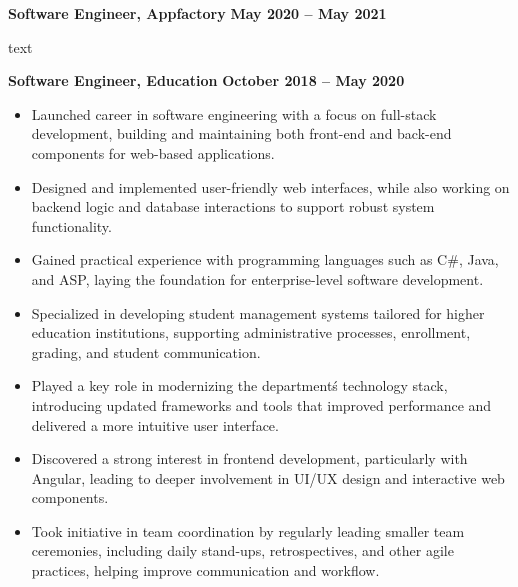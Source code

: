 \documentclass[10pt, a4paper]{cvhari}
\begin{document}
\smallskip
\divider
\smallskip

    \textbf{Software Engineer, Appfactory} \hfill \textbf{May 2020 -- May 2021}

    \vspace{0.2em}
    \par
        text
    \par


\smallskip
\divider
\smallskip

    \textbf{Software Engineer, Education} \hfill \textbf{October 2018 -- May 2020}

    \vspace{0.2em}
    \begin{itemize}
         
        \item Launched career in software engineering with a focus on full-stack development, building and maintaining both front-end and back-end components for web-based applications.

        \item Designed and implemented user-friendly web interfaces, while also working on backend logic and database interactions to support robust system functionality.

        \item Gained practical experience with programming languages such as C\#, Java, and ASP, laying the foundation for enterprise-level software development.

        \item Specialized in developing student management systems tailored for higher education institutions, supporting administrative processes, enrollment, grading, and student communication.

        \item Played a key role in modernizing the department\'s technology stack, introducing updated frameworks and tools that improved performance and delivered a more intuitive user interface.

        \item Discovered a strong interest in frontend development, particularly with Angular, leading to deeper involvement in UI/UX design and interactive web components.

        \item Took initiative in team coordination by regularly leading smaller team ceremonies, including daily stand-ups, retrospectives, and other agile practices, helping improve communication and workflow.

\end{itemize}
\end{document}
